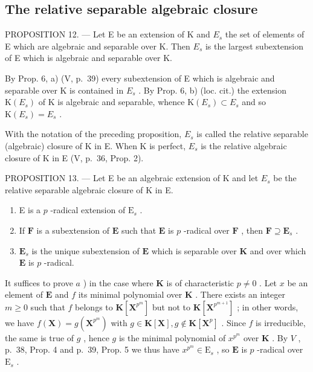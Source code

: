 \subsection{The relative separable algebraic closure}

PROPOSITION 12. --- Let E be an extension of K and \(E_{s}\) the set of elements of E which are algebraic and separable over K. Then \(E_{s}\) is the largest subextension of E which is algebraic and separable over K.

By Prop. 6, a) (V, p.~39) every subextension of E which is algebraic and separable over K is contained in \(E_{s}\) . By Prop. 6, b) (loc. cit.) the extension \(\mathrm{K}(E_{s})\) of K is algebraic and separable, whence \(\mathrm{K}(E_{s}) \subset E_{s}\) and so \(\mathrm{K}(E_{s}) = E_{s}\) .

With the notation of the preceding proposition, \(E_{s}\) is called the relative separable (algebraic) closure of K in E. When K is perfect, \(E_{s}\) is the relative algebraic closure of K in E (V, p.~36, Prop. 2).

PROPOSITION 13. --- Let E be an algebraic extension of K and let \(E_{s}\) be the relative separable algebraic closure of K in E.

\begin{enumerate}
\def\labelenumi{\alph{enumi})}
\item
  E is a \(p\) -radical extension of \(\mathrm{E}_s\) .
\item
  If \(\mathbf{F}\) is a subextension of \(\mathbf{E}\) such that \(\mathbf{E}\) is \(p\) -radical over \(\mathbf{F}\) , then \(\mathbf{F} \supseteq \mathbf{E}_s\) .
\item
  \(\mathbf{E}_s\) is the unique subextension of \(\mathbf{E}\) which is separable over \(\mathbf{K}\) and over which \(\mathbf{E}\) is \(p\) -radical.
\end{enumerate}

It suffices to prove \(a\) ) in the case where \(\mathbf{K}\) is of characteristic \(p \neq 0\) . Let \(x\) be an element of \(\mathbf{E}\) and \(f\) its minimal polynomial over \(\mathbf{K}\) . There exists an integer \(m \geqslant 0\) such that \(f\) belongs to \(\mathbf{K}[\mathbf{X}^{p^m}]\) but not to \(\mathbf{K}[\mathbf{X}^{p^{m+1}}]\) ; in other words, we have \(f(\mathbf{X}) = g(\mathbf{X}^{p^m})\) with \(g \in \mathbf{K}[\mathbf{X}], g \notin \mathbf{K}[\mathbf{X}^p]\) . Since \(f\) is irreducible, the same is true of \(g\) , hence \(g\) is the minimal polynomial of \(x^{p^m}\) over \(\mathbf{K}\) . By \(V\) , p.~38, Prop. 4 and p.~39, Prop. 5 we thus have \(x^{p^m} \in \mathrm{E}_s\) , so \(\mathbf{E}\) is \(p\) -radical over \(\mathrm{E}_s\) .

